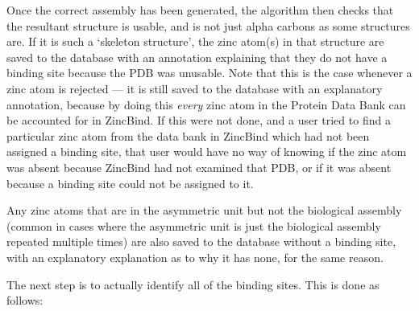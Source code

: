 Once the correct assembly has been generated, the algorithm then checks that the resultant structure is usable, and is not just alpha carbons as some structures are. If it is such a `skeleton structure', the zinc atom(s) in that structure are saved to the database with an annotation explaining that they do not have a binding site because the PDB was unusable. Note that this is the case whenever a zinc atom is rejected --- it is still saved to the database with an explanatory annotation, because by doing this \emph{every} zinc atom in the Protein Data Bank can be accounted for in ZincBind. If this were not done, and a user tried to find a particular zinc atom from the data bank in ZincBind which had not been assigned a binding site, that user would have no way of knowing if the zinc atom was absent because ZincBind had not examined that PDB, or if it was absent because a binding site could not be assigned to it.

Any zinc atoms that are in the asymmetric unit but not the biological assembly (common in cases where the asymmetric unit is just the biological assembly repeated multiple times) are also saved to the database without a binding site, with an explanatory explanation as to why it has none, for the same reason.

The next step is to actually identify all of the binding sites. This is done as follows:

